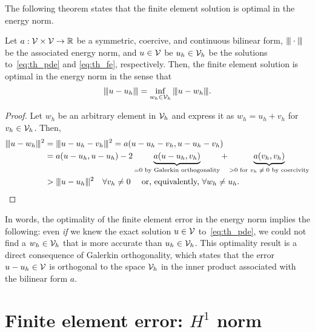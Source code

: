 The following theorem states that the finite element solution is optimal in the energy norm.
\begin{theorem}
  Let $a: \mathcal{V} \times \mathcal{V} \to \mathbb{R}$ be a symmetric, coercive, and continuous bilinear form, $|\kern-1pt|\kern-1pt| \cdot |\kern-1pt|\kern-1pt|$ be the associated energy norm, and $u \in \mathcal{V}$ be $u_h \in \mathcal{V}_h$ be the solutions to~\eqref{eq:th_pde} and \eqref{eq:th_fe}, respectively. Then, the finite element solution is optimal in the energy norm in the sense that
  \begin{equation*}
   |\kern-1pt|\kern-1pt|  u - u_h  |\kern-1pt|\kern-1pt| = \inf_{w_h \in \mathcal{V}_h} |\kern-1pt|\kern-1pt|  u - w_h  |\kern-1pt|\kern-1pt|.
  \end{equation*}
  \begin{proof}
    Let $w_h$ be an arbitrary element in $\mathcal{V}_h$ and express it as $w_h = u_h + v_h$ for $v_h \in \mathcal{V}_h$.  Then,
\begin{align*}
  |\kern-1pt|\kern-1pt| u - w_h |\kern-1pt|\kern-1pt|^2 &= |\kern-1pt|\kern-1pt| u - u_h - v_h |\kern-1pt|\kern-1pt|^2
  = a(u - u_h - v_h, u - u_h - v_h) \\
  &= a(u - u_h, u - u_h) - 2 \underbrace{ a(u - u_h, v_h) }_{= 0 \text{ by Galerkin orthogonality}} + \underbrace{ a(v_h,v_h) }_{> 0 \text{ for $v_h \neq 0$ by coercivity}}
  \\
  &> |\kern-1pt|\kern-1pt| u - u_h |\kern-1pt|\kern-1pt|^2 \quad \forall v_h \neq 0 \quad \text{ or, equivalently, $\forall w_h \neq u_h$}.
\end{align*}
  \end{proof}
\end{theorem}
In words, the optimality of the finite element error in the energy norm implies the following: even \emph{if} we knew the exact solution $u \in \mathcal{V}$ to~\eqref{eq:th_pde}, we could not find a $w_h \in \mathcal{V}_h$ that is more accurate than $u_h \in \mathcal{V}_h$. This optimality result is a direct consequence of Galerkin orthogonality, which states that the error $u - u_h \in \mathcal{V}$ is orthogonal to the space $\mathcal{V}_h$ in the inner product associated with the bilinear form $a$.

\section{Finite element error: $H^1$ norm}


